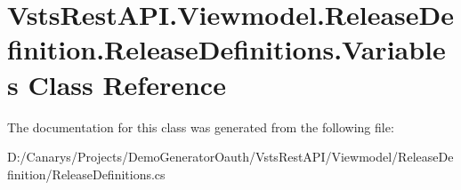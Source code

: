 \hypertarget{class_vsts_rest_a_p_i_1_1_viewmodel_1_1_release_definition_1_1_release_definitions_1_1_variables}{}\section{Vsts\+Rest\+A\+P\+I.\+Viewmodel.\+Release\+Definition.\+Release\+Definitions.\+Variables Class Reference}
\label{class_vsts_rest_a_p_i_1_1_viewmodel_1_1_release_definition_1_1_release_definitions_1_1_variables}


The documentation for this class was generated from the following file\+:\begin{DoxyCompactItemize}
\item 
D\+:/\+Canarys/\+Projects/\+Demo\+Generator\+Oauth/\+Vsts\+Rest\+A\+P\+I/\+Viewmodel/\+Release\+Definition/Release\+Definitions.\+cs\end{DoxyCompactItemize}
